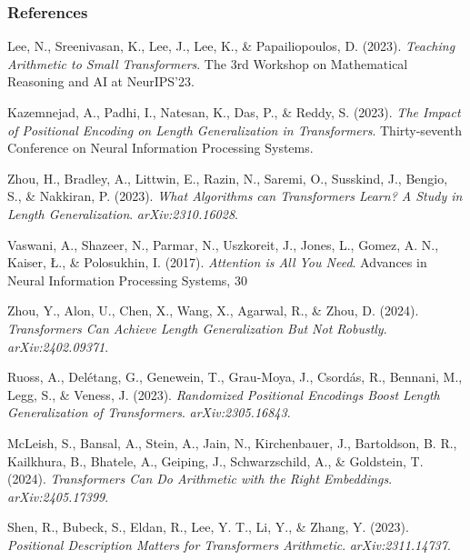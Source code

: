\documentclass[14pt,aspectratio=169]{beamer}
\theoremstyle{remark}
\begin{document}
\begin{frame}[allowframebreaks]
    \frametitle{References}
    \scriptsize
    \begin{thebibliography}{}
        Lee, N., Sreenivasan, K., Lee, J., Lee, K., \& Papailiopoulos, D. (2023). \emph{Teaching Arithmetic to Small Transformers}.
        The 3rd Workshop on Mathematical Reasoning and AI at NeurIPS'23.

        Kazemnejad, A., Padhi, I., Natesan, K., Das, P., \& Reddy, S. (2023). \emph{The Impact of Positional Encoding on Length Generalization in Transformers}.
        Thirty-seventh Conference on Neural Information Processing Systems.

        Zhou, H., Bradley, A., Littwin, E., Razin, N., Saremi, O., Susskind, J., Bengio, S., \& Nakkiran, P. (2023). \emph{What Algorithms can Transformers Learn? A Study in Length Generalization}. \emph{arXiv:2310.16028}.

        Vaswani, A., Shazeer, N., Parmar, N., Uszkoreit, J., Jones, L., Gomez, A. N., Kaiser, Ł., \& Polosukhin, I. (2017). \emph{Attention is All You Need}.
        Advances in Neural Information Processing Systems, 30

        Zhou, Y., Alon, U., Chen, X., Wang, X., Agarwal, R., \& Zhou, D. (2024). \emph{Transformers Can Achieve Length Generalization But Not Robustly}.
        \emph{arXiv:2402.09371}.

        Ruoss, A., Delétang, G., Genewein, T., Grau-Moya, J., Csordás, R., Bennani, M., Legg, S., \& Veness, J. (2023). \emph{Randomized Positional Encodings Boost Length Generalization of Transformers}. \emph{arXiv:2305.16843}.

        McLeish, S., Bansal, A., Stein, A., Jain, N., Kirchenbauer, J., Bartoldson, B. R., Kailkhura, B., Bhatele, A., Geiping, J., Schwarzschild, A., \& Goldstein, T. (2024). \emph{Transformers Can Do Arithmetic with the Right Embeddings}. \emph{arXiv:2405.17399}.

        Shen, R., Bubeck, S., Eldan, R., Lee, Y. T., Li, Y., \& Zhang, Y. (2023). \emph{Positional Description Matters for Transformers Arithmetic}. \emph{arXiv:2311.14737}.
    \end{thebibliography}
\end{frame}
\end{document}
